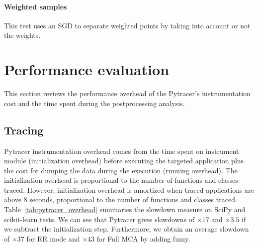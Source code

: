 \documentclass[11pt]{article}
\newcommand{\pytracer}[0]{PyTracer\xspace}
\begin{document}


\paragraph{Weighted samples}

This test uses an SGD to separate weighted points by 
taking into account or not the weights.






\section{Performance evaluation}

This section reviews the performance overhead of the Pytracer's instrumentation cost and the time spent during the postprocessing analysis.


\subsection{Tracing}

Pytracer instrumentation overhead comes from the time spent on instrument module (initialization overhead)
before executing the targeted application plus the cost for dumping the data during the execution (running overhead).
The initialization overhead is proportional to the number of functions and classes traced. 
However, initialization overhead is amortized when traced applications are above 8 seconds,  proportional to 
the number of functions and classes traced.
Table~\ref{tab:pytracer_overhead} summaries the slowdown measure on SciPy
and scikit-learn tests.
We can see that Pytracer gives slowdowns of $\times 17$ and
$\times 3.5$ if we subtract the initialization step.
Furthermore, we obtain an average slowdown of $\times 37$ for RR mode and $\times 43$ for Full MCA by adding fuzzy.
\end{document}

